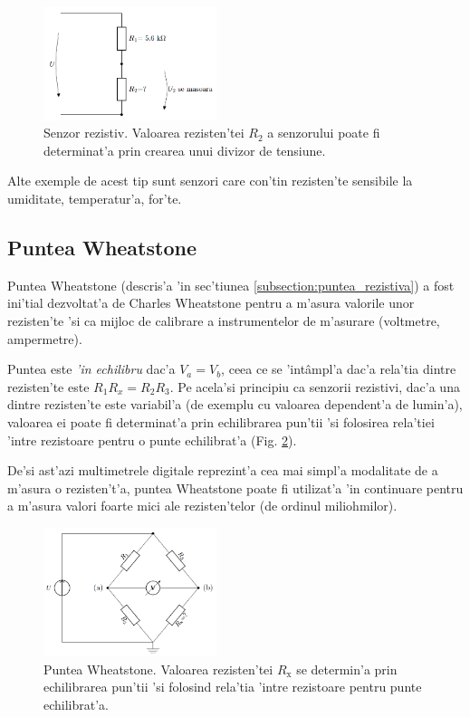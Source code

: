 \begin{figure}[!b]
	\centering
		\includegraphics[width=0.45\textwidth]{laborator_01/figuri/6_senzor_rezistiv}
	\caption{Senzor rezistiv. Valoarea rezisten'tei $R_2$ a senzorului poate fi determinat'a prin crearea unui divizor de tensiune.}
	\label{fig:senzor_rezistiv}
\end{figure}

Alte exemple de acest tip sunt senzori care con'tin rezisten'te sensibile la umiditate, temperatur'a, for'te.

\subsection*{Puntea Wheatstone}

Puntea Wheatstone \cite{aplicatii_punte_wheatstone} (descris'a 'in sec'tiunea \ref{subsection:puntea_rezistiva}) a fost ini'tial dezvoltat'a de Charles Wheatstone pentru a m'asura valorile unor rezisten'te 'si ca mijloc de calibrare a instrumentelor de m'asurare (voltmetre, ampermetre).

Puntea este \textit{'in echilibru} dac'a $V_a=V_b$, ceea ce se 'int\^ampl'a dac'a rela'tia dintre rezisten'te este $R_1 R_x = R_2 R_3$. Pe acela'si principiu ca senzorii rezistivi, dac'a una dintre rezisten'te este variabil'a (de exemplu cu valoarea dependent'a de lumin'a), valoarea ei poate fi determinat'a prin echilibrarea pun'tii 'si folosirea rela'tiei 'intre rezistoare pentru o punte echilibrat'a (Fig. \ref{fig:punte_Wheatstone}).

De'si ast'azi multimetrele digitale reprezint'a cea mai simpl'a modalitate de a m'asura o rezisten't'a, puntea Wheatstone poate fi utilizat'a 'in continuare pentru a m'asura valori foarte mici ale rezisten'telor (de ordinul miliohmilor).

\begin{figure}[!t]
	\centering
		\includegraphics[width=0.45\textwidth]{laborator_01/figuri/6_punte_Wheatstone}
	\caption{Puntea Wheatstone. Valoarea rezisten'tei $R_\mathrm{x}$ se determin'a prin echilibrarea pun'tii 'si folosind rela'tia 'intre rezistoare pentru punte echilibrat'a.}
	\label{fig:punte_Wheatstone}
\end{figure}
